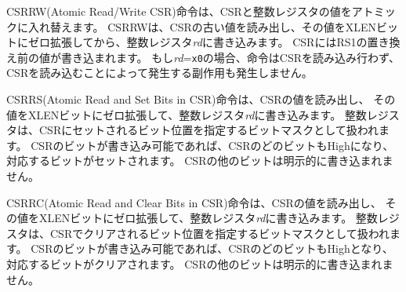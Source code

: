 CSRRW(Atomic Read/Write CSR)命令は、CSRと整数レジスタの値をアトミックに入れ替えます。
CSRRWは、CSRの古い値を読み出し、その値をXLENビットにゼロ拡張してから、整数レジスタ{\em rd}に書き込みます。
CSRにはRS1の置き換え前の値が書き込まれます。
もし{\em rd}={\tt x0}の場合、命令はCSRを読み込み行わず、CSRを読み込むことによって発生する副作用も発生しません。

\begin{comment}
The CSRRS (Atomic Read and Set Bits in CSR) instruction reads the
value of the CSR, zero-extends the value to XLEN bits, and writes it
to integer register {\em rd}.  The initial value in integer register
{\em rs1} is treated as a bit mask that specifies bit positions to be
set in the CSR.  Any bit that is high in {\em rs1} will cause the
corresponding bit to be set in the CSR, if that CSR bit is writable.
Other bits in the CSR are not explicitly written.
\end{comment}

CSRRS(Atomic Read and Set Bits in CSR)命令は、CSRの値を読み出し、
その値をXLENビットにゼロ拡張して、整数レジスタ{\em rd}に書き込みます。
整数レジスタは、CSRにセットされるビット位置を指定するビットマスクとして扱われます。
CSRのビットが書き込み可能であれば、CSRのどのビットもHighになり、対応するビットがセットされます。
CSRの他のビットは明示的に書き込まれません。

\begin{comment}
The CSRRC (Atomic Read and Clear Bits in CSR) instruction reads the
value of the CSR, zero-extends the value to XLEN bits, and writes it
to integer register {\em rd}.  The initial value in integer register
{\em rs1} is treated as a bit mask that specifies bit positions to be
cleared in the CSR.  Any bit that is high in {\em rs1} will cause the
corresponding bit to be cleared in the CSR, if that CSR bit is writable.
Other bits in the CSR are not explicitly written.
\end{comment}

CSRRC(Atomic Read and Clear Bits in CSR)命令は、CSRの値を読み出し、
その値をXLENビットにゼロ拡張して、整数レジスタ{\em rd}に書き込みます。
整数レジスタは、CSRでクリアされるビット位置を指定するビットマスクとして扱われます。
CSRのビットが書き込み可能であれば、CSRのどのビットもHighとなり、対応するビットがクリアされます。
CSRの他のビットは明示的に書き込まれません。

\begin{comment}
For both CSRRS and CSRRC, if {\em rs1}={\tt x0}, then the instruction
will not write to the CSR at all, and so shall not cause any of the
side effects that might otherwise occur on a CSR write, nor
raise illegal instruction exceptions on accesses to read-only CSRs.
Both CSRRS and CSRRC always read the addressed CSR and cause any read
side effects regardless of {\em rs1} and {\em rd} fields.  Note that
if {\em rs1} specifies a register holding a zero value other than {\tt
  x0}, the instruction will still attempt to write the unmodified
value back to the CSR and will cause any attendant side effects.  A
CSRRW with {\em rs1}={\tt x0} will attempt to write zero to the
destination CSR.
\end{comment}

